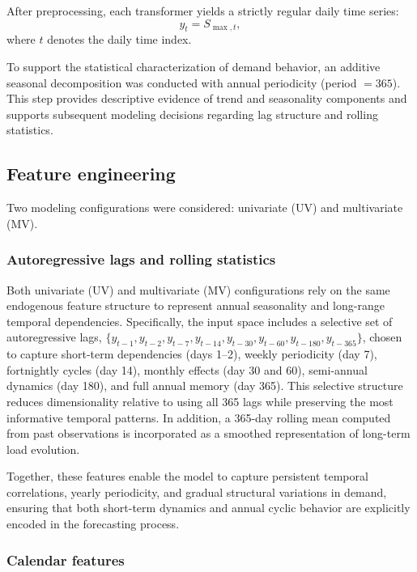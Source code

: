 After preprocessing, each transformer yields a strictly regular daily time series:
\begin{equation}
y_t = S_{\max,t},
\end{equation}
where $t$ denotes the daily time index.

To support the statistical characterization of demand behavior, an additive seasonal decomposition was conducted with annual periodicity (period $=365$). This step provides descriptive evidence of trend and seasonality components and supports subsequent modeling decisions regarding lag structure and rolling statistics.

\subsection{Feature engineering}
\label{subsec:feature_engineering}

Two modeling configurations were considered: univariate (UV) and multivariate (MV).

\subsubsection{Autoregressive lags and rolling statistics}

Both univariate (UV) and multivariate (MV) configurations rely on the same endogenous feature structure to represent annual seasonality and long-range temporal dependencies. Specifically, the input space includes a selective set of autoregressive lags, $\{y_{t-1}, y_{t-2}, y_{t-7}, y_{t-14}, y_{t-30}, y_{t-60}, y_{t-180}, y_{t-365}\}$, chosen to capture short-term dependencies (days 1--2), weekly periodicity (day 7), fortnightly cycles (day 14), monthly effects (day 30 and 60), semi-annual dynamics (day 180), and full annual memory (day 365). This selective structure reduces dimensionality relative to using all 365 lags while preserving the most informative temporal patterns. In addition, a 365-day rolling mean computed from past observations is incorporated as a smoothed representation of long-term load evolution.

Together, these features enable the model to capture persistent temporal correlations, yearly periodicity, and gradual structural variations in demand, ensuring that both short-term dynamics and annual cyclic behavior are explicitly encoded in the forecasting process.


\subsubsection{Calendar features}

